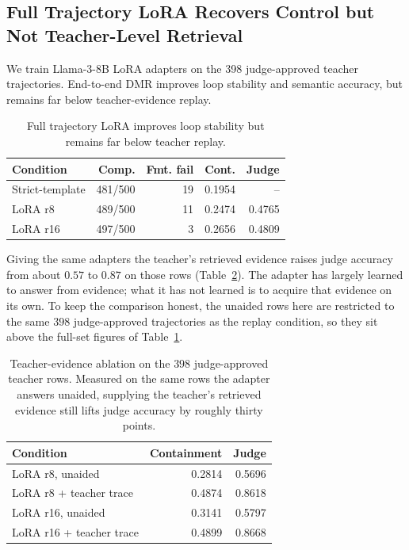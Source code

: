 \documentclass[11pt]{article}
\begin{document}
\subsection{Full Trajectory LoRA Recovers Control but Not Teacher-Level Retrieval}

We train Llama-3-8B LoRA adapters on the 398 judge-approved teacher trajectories. End-to-end DMR improves loop stability and semantic accuracy, but remains far below teacher-evidence replay.

\begin{table}[t]
\centering
\small
\begin{tabular}{lrrrr}
\toprule
\textbf{Condition} & \textbf{Comp.} & \textbf{Fmt. fail} & \textbf{Cont.} & \textbf{Judge} \\
\midrule
Strict-template & 481/500 & 19 & 0.1954 & -- \\
LoRA r8 & 489/500 & 11 & 0.2474 & 0.4765 \\
LoRA r16 & 497/500 & 3 & 0.2656 & 0.4809 \\
\bottomrule
\end{tabular}
\caption{Full trajectory LoRA improves loop stability but remains far below teacher replay.}
\label{tab:lora}
\end{table}

Giving the same adapters the teacher's retrieved evidence raises judge accuracy from about $0.57$ to $0.87$ on those rows (Table~\ref{tab:teacherablation}). The adapter has largely learned to answer from evidence; what it has not learned is to acquire that evidence on its own. To keep the comparison honest, the unaided rows here are restricted to the same $398$ judge-approved trajectories as the replay condition, so they sit above the full-set figures of Table~\ref{tab:lora}.

\begin{table}[t]
\centering
\small
\begin{tabular}{lrr}
\toprule
\textbf{Condition} & \textbf{Containment} & \textbf{Judge} \\
\midrule
LoRA r8, unaided & 0.2814 & 0.5696 \\
LoRA r8 + teacher trace & 0.4874 & 0.8618 \\
LoRA r16, unaided & 0.3141 & 0.5797 \\
LoRA r16 + teacher trace & 0.4899 & 0.8668 \\
\bottomrule
\end{tabular}
\caption{Teacher-evidence ablation on the $398$ judge-approved teacher rows. Measured on the same rows the adapter answers unaided, supplying the teacher's retrieved evidence still lifts judge accuracy by roughly thirty points.}
\label{tab:teacherablation}
\end{table}
\end{document}
